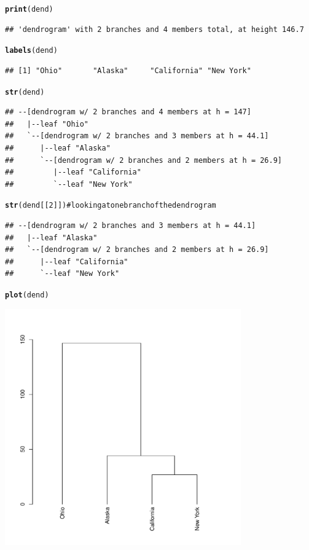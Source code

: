 \documentclass[shortnames,nojss,article]{jss}\usepackage{graphicx, color}
\makeatletter
\newcommand{\hlfunctioncall}[1]{\textcolor[rgb]{0.501960784313725,0,0.329411764705882}{\textbf{#1}}}%
\newcommand{\hlcomment}[1]{\textcolor[rgb]{0.180392156862745,0.6,0.341176470588235}{#1}}%
\newenvironment{kframe}{%
 \def\at@end@of@kframe{}%
 \ifinner\ifhmode%
  \def\at@end@of@kframe{\end{minipage}}%
  \begin{minipage}{\columnwidth}%
 \fi\fi%
 \def\FrameCommand##1{\hskip\@totalleftmargin \hskip-\fboxsep
 \colorbox{shadecolor}{##1}\hskip-\fboxsep
     \hskip-\linewidth \hskip-\@totalleftmargin \hskip\columnwidth}%
 \MakeFramed {\advance\hsize-\width
   \@totalleftmargin\z@ \linewidth\hsize
   \@setminipage}}%
 {\par\unskip\endMakeFramed%
 \at@end@of@kframe}
\newenvironment{knitrout}{}{} %
\makeatother
\begin{document}
\begin{knitrout}
\color{fgcolor}\begin{kframe}
\begin{alltt}
\hlfunctioncall{print}(dend)
\end{alltt}
\begin{verbatim}
## 'dendrogram' with 2 branches and 4 members total, at height 146.7
\end{verbatim}
\begin{alltt}
\hlfunctioncall{labels}(dend)
\end{alltt}
\begin{verbatim}
## [1] "Ohio"       "Alaska"     "California" "New York"
\end{verbatim}
\begin{alltt}
\hlfunctioncall{str}(dend)
\end{alltt}
\begin{verbatim}
## --[dendrogram w/ 2 branches and 4 members at h = 147]
##   |--leaf "Ohio" 
##   `--[dendrogram w/ 2 branches and 3 members at h = 44.1]
##      |--leaf "Alaska" 
##      `--[dendrogram w/ 2 branches and 2 members at h = 26.9]
##         |--leaf "California" 
##         `--leaf "New York"
\end{verbatim}
\begin{alltt}
\hlfunctioncall{str}(dend[[2]])  \hlcomment{# looking at one branch of the dendrogram}
\end{alltt}
\begin{verbatim}
## --[dendrogram w/ 2 branches and 3 members at h = 44.1]
##   |--leaf "Alaska" 
##   `--[dendrogram w/ 2 branches and 2 members at h = 26.9]
##      |--leaf "California" 
##      `--leaf "New York"
\end{verbatim}
\begin{alltt}
\hlfunctioncall{plot}(dend)
\end{alltt}
\end{kframe}

{\centering \includegraphics[width=4in,height=4in]{figure/unnamed-chunk-4} 

}



\end{knitrout}
\end{document}
